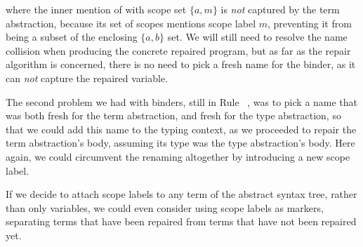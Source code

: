 \noindent%
%
where the inner mention of  with scope set $\{a, m\}$ is \emph{not}
captured by the term abstraction, because its set of scopes mentions scope label
$m$, preventing it from being a subset of the enclosing $\{a, b\}$ set.  We will
still need to resolve the name collision when producing the concrete repaired
program, but as far as the repair algorithm is concerned, there is no need to
pick a fresh name for the binder, as it can \emph{not} capture the repaired
variable.

The second problem we had with binders, still in Rule ~, was to
pick a name that was both fresh for the term abstraction, and fresh for the type
abstraction, so that we could add this name to the typing context, as we
proceeded to repair the term abstraction's body, assuming its type was the type
abstraction's body.  Here again, we could circumvent the renaming altogether by
introducing a new scope label.

If we decide to attach scope labels to any term of the abstract syntax tree,
rather than only variables, we could even consider using scope labels as
markers, separating terms that have been repaired from terms that have not been
repaired yet.
